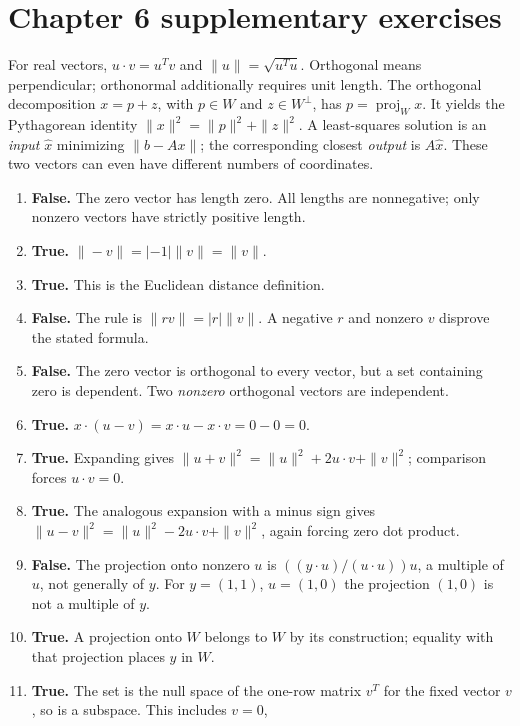 \section{Chapter 6 supplementary exercises}
For real vectors, $u\cdot v=u^Tv$ and $\|u\|=\sqrt{u^Tu}$.
Orthogonal means perpendicular; orthonormal additionally requires unit length.
The orthogonal decomposition $x=p+z$, with $p\in W$ and $z\in W^\perp$,
has $p=\operatorname{proj}_W x$. It yields the Pythagorean identity
$\|x\|^2=\|p\|^2+\|z\|^2$.
A least-squares solution is an \emph{input} $\widehat x$ minimizing
$\|b-Ax\|$; the corresponding closest \emph{output} is $A\widehat x$.
These two vectors can even have different numbers of coordinates.

\begin{enumerate}[label=(\alph*)]
\item \textbf{False.} The zero vector has length zero. All lengths
are nonnegative; only nonzero vectors have strictly positive length.
\item \textbf{True.} $\|-v\|=|-1|\|v\|=\|v\|$.
\item \textbf{True.} This is the Euclidean distance definition.
\item \textbf{False.} The rule is $\|rv\|=|r|\|v\|$.
A negative $r$ and nonzero $v$ disprove the stated formula.
\item \textbf{False.} The zero vector is orthogonal to every vector,
but a set containing zero is dependent. Two \emph{nonzero} orthogonal
vectors are independent.
\item \textbf{True.} $x\cdot(u-v)=x\cdot u-x\cdot v=0-0=0$.
\item \textbf{True.} Expanding gives
$\|u+v\|^2=\|u\|^2+2u\cdot v+\|v\|^2$; comparison forces $u\cdot v=0$.
\item \textbf{True.} The analogous expansion with a minus sign gives
$\|u-v\|^2=\|u\|^2-2u\cdot v+\|v\|^2$, again forcing zero dot product.
\item \textbf{False.} The projection onto nonzero $u$ is
$((y\cdot u)/(u\cdot u))u$, a multiple of $u$, not generally of $y$.
For $y=(1,1)$, $u=(1,0)$ the projection $(1,0)$ is not a multiple of $y$.
\item \textbf{True.} A projection onto $W$ belongs to $W$ by its
construction; equality with that projection places $y$ in $W$.
\item \textbf{True.} The set is the null space of the one-row matrix
$v^T$ for the fixed vector $v$, so is a subspace. This includes $v=0$,

\end{enumerate}

